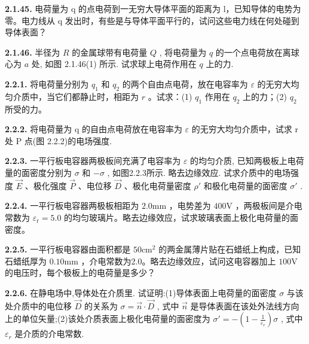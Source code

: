 \textbf{2.1.45.} 电荷量为 q 的点电荷到一无穷大导体平面的距离为 l，已知导体的电势为零。电力线从 q 发出时，有些是与导体平面平行的，试问这些电力线在何处碰到导体表面？

\vfill
\newpage

\textbf{2.1.46.} 半径为 $R$ 的金属球带有电荷量 $Q$ , 将电荷量为 $q$ 的一个点电荷放在离球心为 $a$ 处, 如图 2.1.46(1) 所示. 试求球上电荷作用在 $q$ 上的力.

\begin{center}
\end{center}

\vfill
\newpage

\textbf{2.2.1.} 将电荷量分别为 $q_{1}$ 和 $q_{2}$ 的两个自由点电荷，放在电容率为 $\varepsilon$ 的无穷大均匀介质中，当它们都静止时，相距为 $r$ 。试求：(1) $q_{1}$ 作用在 $q_{2}$ 上的力；(2) $q_{2}$ 所受的力。

\vfill
\newpage

\textbf{2.2.2.} 将电荷量为 q 的自由点电荷放在电容率为 $\varepsilon$ 的无穷大均匀介质中，试求 r 处 P 点(图 2.2.2)的电场强度.

\vfill
\newpage

\textbf{2.2.3.} 一平行板电容器两极板间充满了电容率为 $\varepsilon$ 的均匀介质, 已知两极板上电荷量的面密度分别为 $\sigma$ 和 $-\sigma$ , 如图2.2.3所示. 略去边缘效应. 试求介质中的电场强度 $\vec{E}$ 、极化强度 $\vec{P}$ 、电位移 $\vec{D}$ 、极化电荷量密度 $\rho'$ 和极化电荷量的面密度 $\sigma'$ .

\begin{center}
\end{center}

\vfill
\newpage

\textbf{2.2.4.} 一平行板电容器两极板相距为 $2.0\mathrm{mm}$ ，电势差为 $400\mathrm{V}$ ，两极板间是介电常数为 $\varepsilon_{\mathrm{r}} = 5.0$ 的均匀玻璃片。略去边缘效应，试求玻璃表面上极化电荷量的面密度。

\vfill
\newpage

\textbf{2.2.5.} 一平行板电容器由面积都是 $50\mathrm{cm}^2$ 的两金属薄片贴在石蜡纸上构成，已知石蜡纸厚为 $0.10\mathrm{mm}$ ，介电常数为2.0。略去边缘效应，试问这电容器加上 $100\mathrm{V}$ 的电压时，每个极板上的电荷量是多少？

\vfill
\newpage

\textbf{2.2.6.} 在静电场中,导体处在介质里. 试证明:(1)导体表面上电荷量的面密度 $\sigma$ 与该处介质中的电位移 $\vec{D}$ 的关系为 $\sigma = \vec{n} \cdot \vec{D}$ , 式中 $\vec{n}$ 是导体表面在该处外法线方向上的单位矢量;(2)该处介质表面上极化电荷量的面密度为 $\displaystyle \sigma' = -\left(1 - \frac{1}{\varepsilon_r}\right)\sigma$ , 式中 $\varepsilon_r$ 是介质的介电常数.

